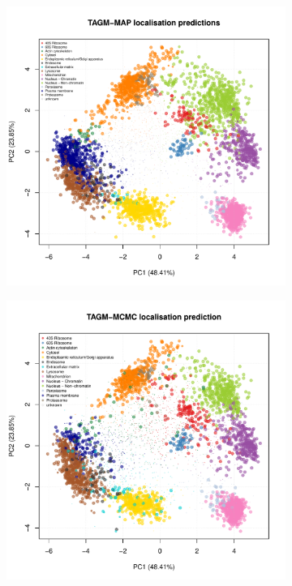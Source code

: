 \documentclass[12pt,english]{article}\usepackage[]{graphicx}\usepackage[]{color}
\makeatletter
\def\maxwidth{ %
  \ifdim\Gin@nat@width>\linewidth
    \linewidth
  \else
    \Gin@nat@width
  \fi
}
\newenvironment{knitrout}{}{} %
\makeatother
\begin{document}
\begin{figure}[p]
    \begin{subfigure}[t]{0.5\textwidth}
\begin{knitrout}
\color{fgcolor}
\includegraphics[width=\maxwidth]{figure/assignmentPCAMAP-1} 

\end{knitrout}
    \end{subfigure}%
    \begin{subfigure}[t]{0.5\textwidth}
\begin{knitrout}
\color{fgcolor}
\includegraphics[width=\maxwidth]{figure/assignmentPCAMCMC-1} 


\end{knitrout}
\end{subfigure}
\end{figure}
\end{document}
